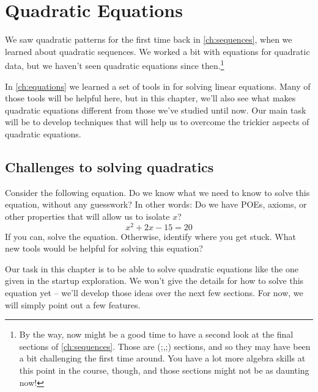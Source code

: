 \chapter{Quadratic Equations}
\label{ch:quadeq}


We saw quadratic patterns for the first time back in \cref{ch:sequences}, when we learned about quadratic sequences. We worked a bit with equations for quadratic data, but we haven't seen quadratic equations since then.\footnote{By the way, now might be a good time to have a second look at the final sections of \cref{ch:sequences}. Those are (;,;) sections, and so they may have been a bit challenging the first time around. You have a lot more algebra skills at this point in the course, though, and those sections might not be as daunting now!}

In \cref{ch:equations} we learned a set of tools in for solving linear equations. Many of those tools will be helpful here, but in this chapter, we'll also see what makes quadratic equations different from those we've studied until now. Our main task will be to develop techniques that will help us to overcome the trickier aspects of quadratic equations.

\section{Challenges to solving quadratics}

\begin{boxexplore}
Consider the following equation. Do we know what we need to know to solve this equation, without any guesswork? In other words: Do we have POEs, axioms, or other properties that will allow us to isolate $x$?
\[x^2 + 2x - 15 = 20\]
If you can, solve the equation. Otherwise, identify where you get stuck. What new tools would be helpful for solving this equation?
\end{boxexplore}

Our task in this chapter is to be able to solve quadratic equations like the one given in the startup exploration. We won't give the details for how to solve this equation yet -- we'll develop those ideas over the next few sections. For now, we will simply point out a few features.

